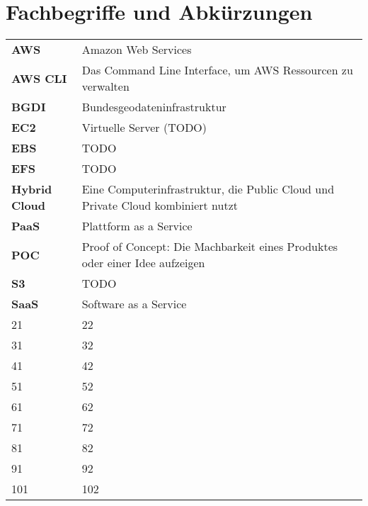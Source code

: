 \section{Fachbegriffe und Abkürzungen}
\begin{tabular}{p{}p{}}
    \textbf{AWS} & Amazon Web Services\\
    \textbf{AWS CLI} & Das Command Line Interface, um AWS Ressourcen zu verwalten\\
    \textbf{BGDI} & Bundesgeodateninfrastruktur\\
    \textbf{EC2} & Virtuelle Server (TODO)\\
    \textbf{EBS} & TODO\\
    \textbf{EFS} & TODO\\
    \textbf{Hybrid Cloud} & Eine Computerinfrastruktur, die Public Cloud und Private Cloud kombiniert nutzt\\
	\textbf{PaaS} & Plattform as a Service\\
	\textbf{POC} & Proof of Concept: Die Machbarkeit eines Produktes oder einer Idee aufzeigen\\
	\textbf{S3} & TODO\\
	\textbf{SaaS} & Software as a Service\\
	21 & 22\\
	31 & 32\\
	41 & 42\\
	51 & 52\\
	61 & 62\\
	71 & 72\\
	81 & 82\\
	91 & 92\\
	101 & 102\\
\end{tabular}
